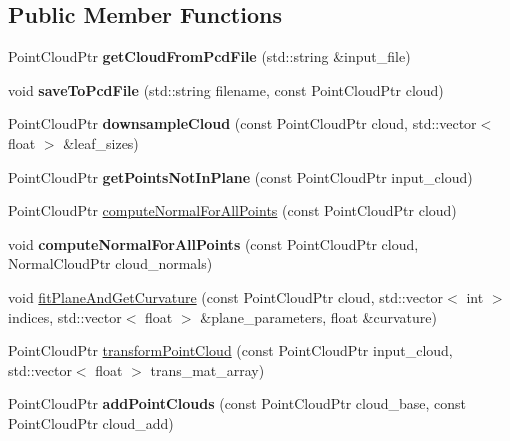 \subsection*{Public Member Functions}
\begin{DoxyCompactItemize}
\item 
\hypertarget{classaml__pcloud_1_1_p_c_l_processor_add331335b42412c0351a0c4ae6d3230e}{Point\-Cloud\-Ptr {\bfseries get\-Cloud\-From\-Pcd\-File} (std\-::string \&input\-\_\-file)}\label{classaml__pcloud_1_1_p_c_l_processor_add331335b42412c0351a0c4ae6d3230e}

\item 
\hypertarget{classaml__pcloud_1_1_p_c_l_processor_a3d384355834f360c8d4cd8d14f046f1b}{void {\bfseries save\-To\-Pcd\-File} (std\-::string filename, const Point\-Cloud\-Ptr cloud)}\label{classaml__pcloud_1_1_p_c_l_processor_a3d384355834f360c8d4cd8d14f046f1b}

\item 
\hypertarget{classaml__pcloud_1_1_p_c_l_processor_a1d6da7c112b055342e0e0b43b6e852af}{Point\-Cloud\-Ptr {\bfseries downsample\-Cloud} (const Point\-Cloud\-Ptr cloud, std\-::vector$<$ float $>$ \&leaf\-\_\-sizes)}\label{classaml__pcloud_1_1_p_c_l_processor_a1d6da7c112b055342e0e0b43b6e852af}

\item 
\hypertarget{classaml__pcloud_1_1_p_c_l_processor_a5709601bfeca02f810f783d9079ba25b}{Point\-Cloud\-Ptr {\bfseries get\-Points\-Not\-In\-Plane} (const Point\-Cloud\-Ptr input\-\_\-cloud)}\label{classaml__pcloud_1_1_p_c_l_processor_a5709601bfeca02f810f783d9079ba25b}

\item 
Point\-Cloud\-Ptr \hyperlink{classaml__pcloud_1_1_p_c_l_processor_a4f066df5ae0e421f358d17529d6234d8}{compute\-Normal\-For\-All\-Points} (const Point\-Cloud\-Ptr cloud)
\item 
\hypertarget{classaml__pcloud_1_1_p_c_l_processor_a872ffec38fa09684c2a0f8873876346f}{void {\bfseries compute\-Normal\-For\-All\-Points} (const Point\-Cloud\-Ptr cloud, Normal\-Cloud\-Ptr cloud\-\_\-normals)}\label{classaml__pcloud_1_1_p_c_l_processor_a872ffec38fa09684c2a0f8873876346f}

\item 
void \hyperlink{classaml__pcloud_1_1_p_c_l_processor_afaa37a472ad7a626b6bd9bbf347ee38f}{fit\-Plane\-And\-Get\-Curvature} (const Point\-Cloud\-Ptr cloud, std\-::vector$<$ int $>$ indices, std\-::vector$<$ float $>$ \&plane\-\_\-parameters, float \&curvature)
\item 
Point\-Cloud\-Ptr \hyperlink{classaml__pcloud_1_1_p_c_l_processor_a5a1ef67cd7cbea80867faf9cd7c5bae7}{transform\-Point\-Cloud} (const Point\-Cloud\-Ptr input\-\_\-cloud, std\-::vector$<$ float $>$ trans\-\_\-mat\-\_\-array)
\item 
\hypertarget{classaml__pcloud_1_1_p_c_l_processor_a1e1cd933a9103ed9cc220193a1f3bfa4}{Point\-Cloud\-Ptr {\bfseries add\-Point\-Clouds} (const Point\-Cloud\-Ptr cloud\-\_\-base, const Point\-Cloud\-Ptr cloud\-\_\-add)}\label{classaml__pcloud_1_1_p_c_l_processor_a1e1cd933a9103ed9cc220193a1f3bfa4}


\end{DoxyCompactItemize}
